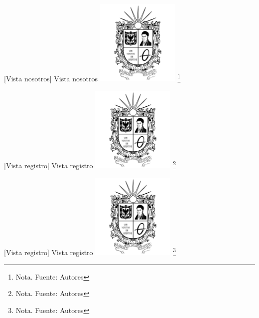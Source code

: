 \begin{itemize}
{      \vspace{2mm}
    \begin{minipage}{0.9\textwidth}
    \centering
    [{Vista nosotros}]{ Vista nosotros }
    \label{prot2}
    \includegraphics[width=0.3\textwidth]{Content/Images/Escudo_UD.png}
    \footnote{Nota. \textup{Fuente: Autores}}
    \end{minipage}
    
    \vspace{2mm}
    \begin{minipage}{0.9\textwidth}
    \centering
    [{Vista registro}]{ Vista registro }
    \label{prot3}
    \includegraphics[width=0.3\textwidth]{Content/Images/Escudo_UD.png}
    \footnote{Nota. \textup{Fuente: Autores}}
    \end{minipage}
    
    \vspace{2mm}
    \begin{minipage}{0.9\textwidth}
    \centering
    [{Vista registro}]{ Vista registro }
    \label{prot4}
    \includegraphics[width=0.3\textwidth]{Content/Images/Escudo_UD.png}
    \footnote{Nota. \textup{Fuente: Autores}}
    \end{minipage}
    
}
\end{itemize}
